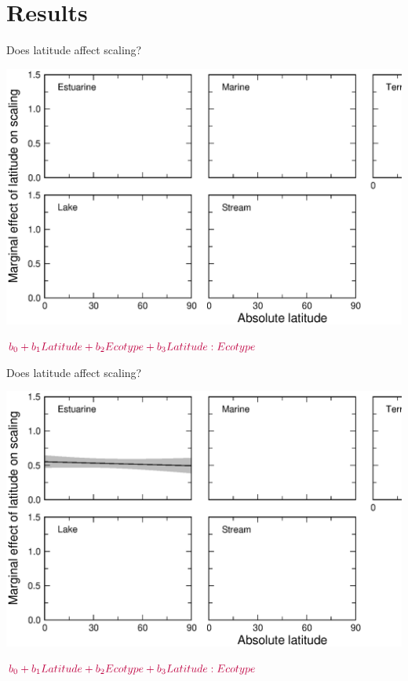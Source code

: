 \documentclass{beamer}
\begin{document}
\section*{Results}
  \begin{frame}{Does latitude affect scaling?}
    \begin{center}
      \includegraphics*[width=.9\textwidth]{Figures/results/Gen_vs_S_marginal_axis.eps}

      \vspace{.8cm}
      ${\color{purple}b_0+b_1Latitude+b_2Ecotype+b_3Latitude:Ecotype}$

    \end{center}
  \end{frame}


  \begin{frame}{Does latitude affect scaling?}
    \begin{center}
      \includegraphics*[width=.9\textwidth]{Figures/results/Gen_vs_S_marginal_one.eps}

      \vspace{.8cm}
      ${\color{purple}b_0+b_1Latitude+b_2Ecotype+b_3Latitude:Ecotype}$

    \end{center}
  \end{frame}
\end{document}
